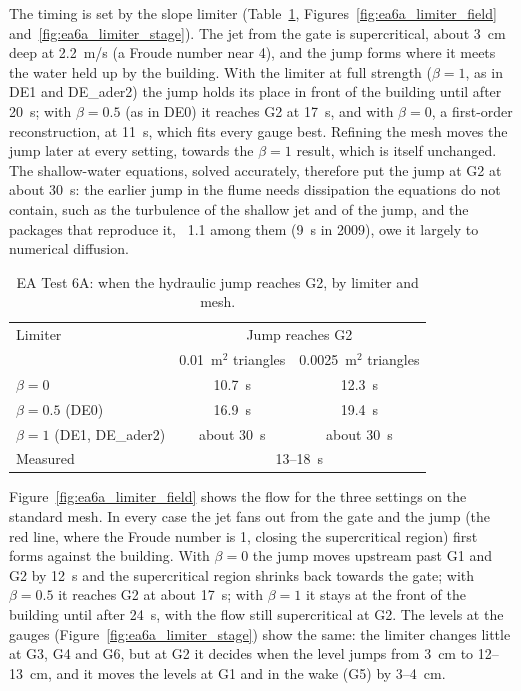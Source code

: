 The timing is set by the slope limiter (Table~\ref{tab:ea6a_limiter},
Figures~\ref{fig:ea6a_limiter_field} and~\ref{fig:ea6a_limiter_stage}).
The jet from the gate is supercritical, about 3~cm deep at 2.2~m/s (a
Froude number near 4), and the jump forms where it meets the water held up
by the building. With the limiter at full strength ($\beta = 1$, as in DE1
and DE\_ader2) the jump holds its place in front of the building until
after 20~s; with $\beta = 0.5$ (as in DE0) it reaches G2 at 17~s, and with
$\beta = 0$, a first-order reconstruction, at 11~s, which fits every gauge
best. Refining the mesh moves the jump later at every setting, towards the
$\beta = 1$ result, which is itself unchanged. The shallow-water equations,
solved accurately, therefore put the jump at G2 at about 30~s: the earlier
jump in the flume needs dissipation the equations do not contain, such as
the turbulence of the shallow jet and of the jump, and the packages that
reproduce it, \anuga{}~1.1 among them (9~s in 2009), owe it largely to
numerical diffusion.

\begin{table}[h]
\begin{center}
\begin{tabular}{lcc}
\hline
Limiter & \multicolumn{2}{c}{Jump reaches G2} \\
 & 0.01~m$^2$ triangles & 0.0025~m$^2$ triangles \\
\hline
$\beta = 0$ & 10.7~s & 12.3~s \\
$\beta = 0.5$ (DE0) & 16.9~s & 19.4~s \\
$\beta = 1$ (DE1, DE\_ader2) & about 30~s & about 30~s \\
\hline
Measured & \multicolumn{2}{c}{13--18~s} \\
\hline
\end{tabular}
\end{center}
\caption{EA Test 6A: when the hydraulic jump reaches G2, by limiter and mesh.}
\label{tab:ea6a_limiter}
\end{table}

Figure~\ref{fig:ea6a_limiter_field} shows the flow for the three settings
on the standard mesh. In every case the jet fans out from the gate and the
jump (the red line, where the Froude number is 1, closing the
supercritical region) first forms against the building. With $\beta = 0$
the jump moves upstream past G1 and G2 by 12~s and the supercritical
region shrinks back towards the gate; with $\beta = 0.5$ it reaches G2 at
about 17~s; with $\beta = 1$ it stays at the front of the building until
after 24~s, with the flow still supercritical at G2. The levels at the
gauges (Figure~\ref{fig:ea6a_limiter_stage}) show the same: the limiter
changes little at G3, G4 and G6, but at G2 it decides when the level
jumps from 3~cm to 12--13~cm, and it moves the levels at G1 and in the
wake (G5) by 3--4~cm.

